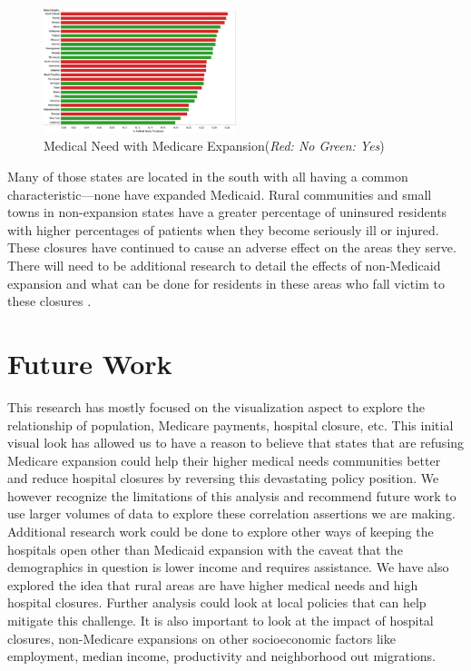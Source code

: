 \documentclass[10pt,conference]{IEEEtran}
\begin{document}
\begin{figure}[htbp]
\centerline{\includegraphics[width=0.5\textwidth]{MedicalNeedw_MedicareExpansion.png}}
\caption{Medical Need with Medicare Expansion(\textit{Red: No Green: Yes})}
\label{MN_ME}
\end{figure}
Many of those states are located in the south with all having a common characteristic—none have expanded Medicaid. Rural communities and small towns in non-expansion states have a greater percentage of uninsured residents with higher percentages of patients when they become seriously ill or injured. These closures have continued to cause an adverse effect on the areas they serve. There will need to be additional research to detail the effects of non-Medicaid expansion and what can be done for residents in these areas who fall victim to these closures \cite{searing}.

\section{Future Work}
This research has mostly focused on the visualization aspect to explore the relationship of population, Medicare payments, hospital closure, etc. This initial visual look has allowed us to have a reason to believe that states that are refusing Medicare expansion could help their higher medical needs communities better and reduce hospital closures by reversing this devastating policy position. We however recognize the limitations of this analysis and recommend future work to use larger volumes of data to explore these correlation assertions we are making. Additional research work could be done to explore other ways of keeping the hospitals open other than Medicaid expansion with the caveat that the demographics in question is lower income and requires assistance. We have also explored the idea that rural areas are have higher medical needs and high hospital closures. Further analysis could look at local policies that can help mitigate this challenge. It is also important to look at the impact of hospital closures, non-Medicare expansions on other socioeconomic factors like employment, median income, productivity and neighborhood out migrations.
\end{document}

